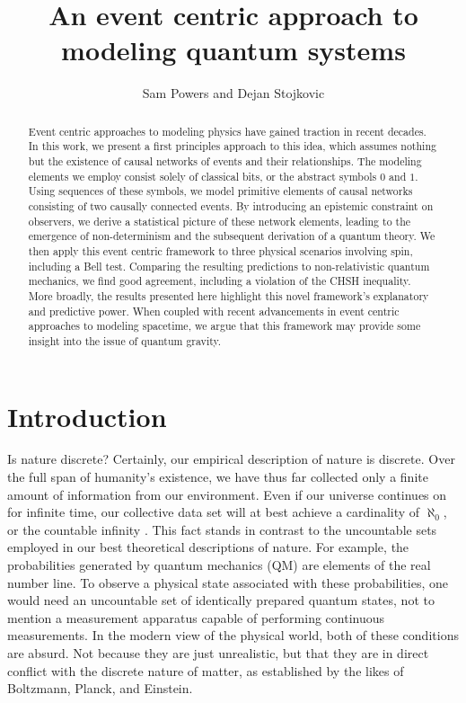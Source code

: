 \documentclass{article}
\title{An event centric approach to modeling quantum systems}
\author{Sam Powers and Dejan Stojkovic}
\affil{Department of Physics SUNY at Buffalo, Buffalo, NY 14260-1500, USA}
\begin{document}
\maketitle
\begin{abstract}

Event centric approaches to modeling physics have gained traction in recent decades. In this work, we present a first principles approach to this idea, which assumes nothing but the existence of causal networks of events and their relationships. The modeling elements we employ consist solely of classical bits, or the abstract symbols $0$ and $1$. Using sequences of these symbols, we model primitive elements of causal networks consisting of two causally connected events. By introducing an epistemic constraint on observers, we derive a statistical picture of these network elements, leading to the emergence of non-determinism and the subsequent derivation of a quantum theory. We then apply this event centric framework to three physical scenarios involving spin, including a Bell test. Comparing the resulting predictions to non-relativistic quantum mechanics, we find good agreement, including a violation of the CHSH inequality. More broadly, the results presented here highlight this novel framework's explanatory and predictive power. When coupled with recent advancements in event centric approaches to modeling spacetime, we argue that this framework may provide some insight into the issue of quantum gravity. 


\end{abstract}

\section{Introduction\label{sec:Introduction}}

 Is nature discrete? Certainly, our empirical description of nature is discrete. Over the full span of humanity's existence, we have thus far collected only a finite amount of information from our environment. Even if our universe continues on for infinite time, our collective data set will at best achieve a cardinality of $\aleph_0$, or the countable infinity \cite{Dauben1979}. This fact stands in contrast to the uncountable sets employed in our best theoretical descriptions of nature. For example, the probabilities generated by quantum mechanics (QM) are elements of the real number line. To observe a physical state associated with these probabilities, one would need an uncountable set of identically prepared quantum states, not to mention a measurement apparatus capable of performing continuous measurements. In the modern view of the physical world, both of these conditions are absurd. Not because they are just unrealistic, but that they are in direct conflict with the discrete nature of matter, as established by the likes of Boltzmann, Planck, and Einstein. 
\end{document}
